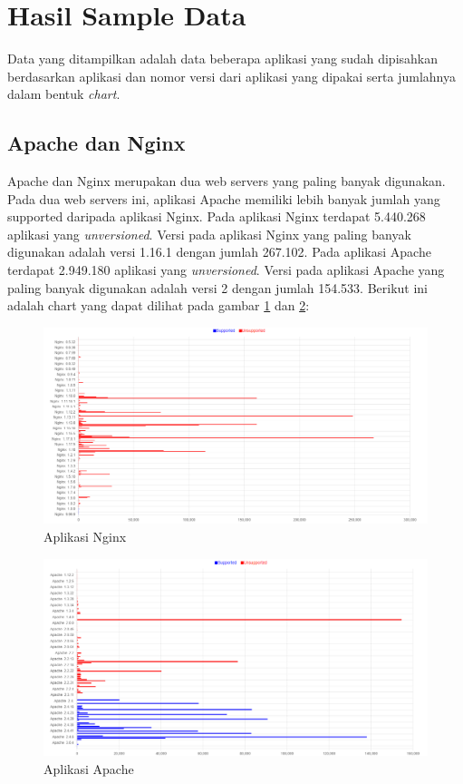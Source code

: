 \section{Hasil Sample Data}
Data yang ditampilkan adalah data beberapa aplikasi yang sudah dipisahkan berdasarkan aplikasi dan nomor versi dari aplikasi yang dipakai serta jumlahnya dalam bentuk \textit{chart}.

\subsection{Apache dan Nginx}
Apache dan Nginx merupakan dua web servers yang paling banyak digunakan. Pada dua web servers ini, aplikasi Apache memiliki lebih banyak jumlah yang supported daripada aplikasi Nginx. Pada aplikasi Nginx terdapat 5.440.268 aplikasi yang \textit{unversioned}. Versi pada aplikasi Nginx yang paling banyak digunakan adalah versi 1.16.1 dengan jumlah 267.102. Pada aplikasi Apache terdapat 2.949.180 aplikasi yang \textit{unversioned}. Versi pada aplikasi Apache yang paling banyak digunakan adalah versi 2 dengan jumlah 154.533. Berikut ini adalah chart yang dapat dilihat pada gambar \ref{fig:data_sample_nginx} dan \ref{fig:data_sample_apache}:
\begin{figure}[H]
	\centering  
	\includegraphics[scale=0.5]{Gambar/hasil_chart_nginx.png}  
	\caption{Aplikasi Nginx} 
	\label{fig:data_sample_nginx} 
\end{figure}

\begin{figure}[H]
	\centering  
	\includegraphics[scale=0.5]{Gambar/hasil_chart_apache.png}  
	\caption{Aplikasi Apache} 
	\label{fig:data_sample_apache} 
\end{figure}

